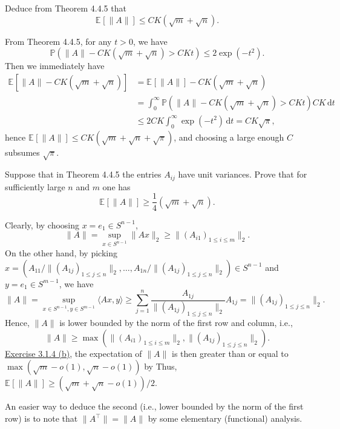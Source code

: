 \begin{problem*}[Exercise 4.4.6]\label{ex4.4.6}
	Deduce from Theorem 4.4.5 that
	\[
		\mathbb{E}_{}[\lVert A \rVert ]
		\leq CK(\sqrt{m} + \sqrt{n} ).
	\]
\end{problem*}
\begin{answer}
	From Theorem 4.4.5, for any \(t > 0\), we have
	\[
		\mathbb{P} (\lVert A \rVert - CK(\sqrt{m} + \sqrt{n} ) > CKt)
		\leq 2 \exp (-t^2).
	\]
	Then we immediately have
	\[
		\begin{split}
			\mathbb{E}_{}[\lVert A \rVert - CK(\sqrt{m} + \sqrt{n} )]
			 & = \mathbb{E}_{}[\lVert A \rVert ] - CK(\sqrt{m} + \sqrt{n} )                                       \\
			 & = \int_{0}^{\infty} \mathbb{P} (\lVert A \rVert - CK(\sqrt{m} + \sqrt{n} ) > CKt) CK \,\mathrm{d}t \\
			 & \leq 2CK \int_{0}^{\infty} \exp (-t^2) \,\mathrm{d}t
			= CK \sqrt{\pi },
		\end{split}
	\]
	hence \(\mathbb{E}_{}[\lVert A \rVert ] \leq CK(\sqrt{m} + \sqrt{n}  + \sqrt{\pi } )\), and choosing a large enough \(C\) subsumes \(\sqrt{\pi } \).
\end{answer}

\begin{problem*}[Exercise 4.4.7]\label{ex4.4.7}
	Suppose that in Theorem 4.4.5 the entries \(A_{ij}\) have unit variances. Prove that for sufficiently large \(n\) and \(m\) one has
	\[
		\mathbb{E}_{}[\lVert A \rVert ]
		\geq \frac{1}{4} ( \sqrt{m} + \sqrt{n}).
	\]
\end{problem*}
\begin{answer}
	Clearly, by choosing \(x = e_1 \in S^{n-1}\),
	\[
		\lVert A \rVert
		= \sup _{x \in S^{n-1} } \lVert Ax \rVert _2
		\geq \lVert (A_{i1})_{1 \leq i \leq m} \rVert _2.
	\]
	On the other hand, by picking \(x = (A_{11} / \lVert (A_{1j})_{1 \leq j \leq n} \rVert _2 , \dots , A_{1n} / \lVert (A_{1j})_{1 \leq j \leq n} \rVert _2 ) \in S^{n-1}\) and \(y = e_1 \in S^{m-1}\), we have
	\[
		\lVert A \rVert
		= \sup _{x \in S^{n-1}, y\in S^{m-1}} \langle Ax, y \rangle
		\geq \sum_{j=1}^{n} \frac{A_{1j}}{\lVert (A_{1j})_{1 \leq j \leq n} \rVert _2} A_{1j}
		= \lVert (A_{1j})_{1 \leq j \leq n} \rVert _2.
	\]
	Hence, \(\lVert A \rVert \) is lower bounded by the norm of the first row and column, i.e.,
	\[
		\lVert A \rVert
		\geq \max (\lVert (A_{i1})_{1 \leq i \leq m} \rVert _2, \lVert (A_{1j})_{1 \leq j \leq n} \rVert _2).
	\]
	\hyperref[ex3.1.4:b]{Exercise 3.1.4 (b)}, the expectation of \(\lVert A \rVert \) is then greater than or equal to \(\max (\sqrt{m} - o(1), \sqrt{n} - o(1))\) by  Thus, \(\mathbb{E}_{}[\lVert A \rVert ] \geq (\sqrt{m} + \sqrt{n} - o(1)) / 2\).
\end{answer}

\begin{remark}
	An easier way to deduce the second (i.e., lower bounded by the norm of the first row) is to note that \(\lVert A^{\top}  \rVert = \lVert A \rVert \) by some elementary (functional) analysis.
\end{remark}